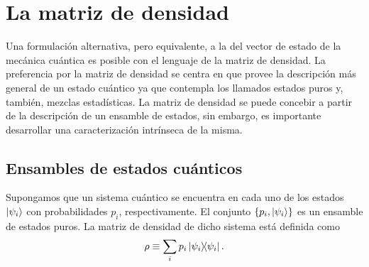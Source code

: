 \chapter{La matriz de densidad} %
Una formulación alternativa, pero equivalente, a la del vector de estado 
de la mecánica cuántica es posible con el lenguaje de la matriz de densidad. 
La preferencia por la matriz de densidad se centra en que provee la descripción
más general de un estado cuántico ya que contempla los llamados estados puros y,
también, mezclas estadísticas. La matriz de densidad se puede concebir 
a partir de la descripción de un ensamble de estados, sin embargo, es
importante desarrollar una caracterización intrínseca  de la misma.  
\section{Ensambles de estados cuánticos} %
Supongamos que un sistema cuántico se encuentra en cada uno de los estados 
$\ket{\psi _i}$ con probabilidades $p_i$, respectivamente. El conjunto 
$\{p_i,\ket{\psi _i} \}$ es un ensamble de estados puros. La matriz de 
densidad de dicho sistema está definida como
\begin{equation}
	\rho \equiv \sum _i p_i\dyad{\psi_i}{\psi_i}.
	\label{eq:rho_def}
\end{equation}

